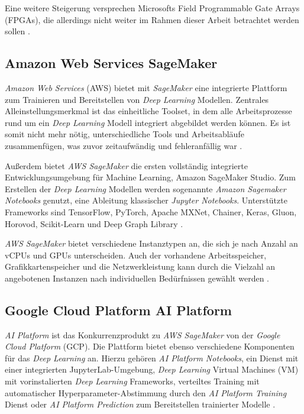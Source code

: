 Eine weitere Steigerung versprechen Microsofts Field Programmable Gate Arrays (FPGAs), die allerdings nicht weiter im Rahmen dieser Arbeit betrachtet werden sollen \cite{KarlFreund.20170828}.

\subsection*{Amazon Web Services SageMaker}

\textit{Amazon Web Services} (AWS) bietet mit \textit{SageMaker} eine integrierte Plattform zum Trainieren und Bereitstellen von \textit{Deep Learning} Modellen. Zentrales Alleinstellungsmerkmal ist das einheitliche Toolset, in dem alle Arbeitsprozesse rund um ein \textit{Deep Learning} Modell integriert abgebildet werden können. Es ist somit nicht mehr nötig, unterschiedliche Tools und Arbeitsabläufe zusammenfügen, was zuvor zeitaufwändig und fehleranfällig war \cite{AmazonWebServices.20200314}.

Außerdem bietet \textit{AWS SageMaker} die ersten vollständig integrierte Entwicklungsumgebung für Machine Learning, \glqq Amazon SageMaker Studio\grqq{}. Zum Erstellen der \textit{Deep Learning} Modellen werden sogenannte \textit{Amazon Sagemaker Notebooks} genutzt, eine Ableitung klassischer \textit{Jupyter Notebooks}. Unterstützte Frameworks sind TensorFlow, PyTorch, Apache MXNet, Chainer, Keras, Gluon, Horovod, Scikit-Learn und Deep Graph Library \cite{AmazonWebServices.20200314}. 

\textit{AWS SageMaker} bietet verschiedene Instanztypen an, die sich je nach Anzahl an vCPUs und GPUs unterscheiden. Auch der vorhandene Arbeitsspeicher, Grafikkartenspeicher und die Netzwerkleistung kann durch die Vielzahl an angebotenen Instanzen nach individuellen Bedürfnissen gewählt werden \cite{AmazonWebServices.20200314b}.

\subsection*{Google Cloud Platform AI Platform}

\textit{AI Platform} ist das Konkurrenzprodukt zu \textit{AWS SageMaker} von der \textit{Google Cloud Platform} (GCP). Die Plattform bietet ebenso verschiedene Komponenten für das \textit{Deep Learning} an. Hierzu gehören \textit{AI Platform Notebooks}, ein Dienst mit einer integrierten JupyterLab-Umgebung, \textit{Deep Learning} Virtual Machines (VM) mit vorinstalierten \textit{Deep Learning} Frameworks, verteiltes Training mit automatischer Hyperparameter-Abstimmung durch den \textit{AI Platform Training} Dienst oder \textit{AI Platform Prediction} zum Bereitstellen trainierter Modelle \cite{GoogleCloudPlatform.20200314}. 

